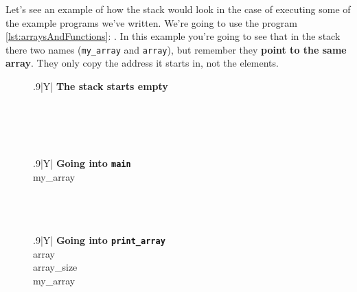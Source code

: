 \documentclass[a4paper]{article}
\begin{document}
Let's see an example of how the stack would look in the case of executing some
of the example programs we've written. We're going to use the program
\ref{lst:arraysAndFunctions}: .
In this example you're going to see that in the stack there two names
(\verb!my_array! and \verb!array!), but remember they \textbf{point to the same
array}. They only copy the address it starts in, not the elements.
\begin{table}[H]
\centering
    \begin{subfigure}{0.33333\linewidth}
        \centering
        \begin{tabularx}{.9\linewidth}{|Y|}
        \hline
        \textbf{The stack starts empty}\\\hline
         \\\hline
        \\ \hline
        \\ \hline
        \\ \hline
        \end{tabularx}
    \end{subfigure}%
    \begin{subfigure}{0.33333\linewidth}
        \centering
        \begin{tabularx}{.9\linewidth}{|Y|}
        \hline
        \textbf{Going into \texttt{main}}\\\hline
        my\_array\\\hline
        \\ \hline
        \\ \hline
        \\ \hline
        \end{tabularx}
    \end{subfigure}%
    \begin{subfigure}{0.33333\linewidth}
        \centering
        \begin{tabularx}{.9\linewidth}{|Y|}
        \hline
        \textbf{Going into \texttt{print\_array}}\\\hline
        array\\\hline
        array\_size\\\hline
        my\_array\\\hline
        \\ \hline
        \end{tabularx}
    \end{subfigure}%



\end{table}
\end{document}
